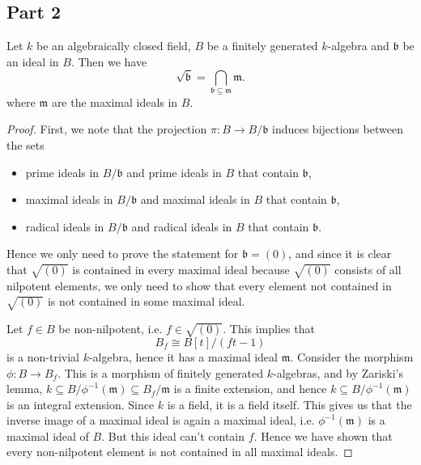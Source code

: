 \subsection{Part 2}
\begin{lemma}
Let $k$ be an algebraically closed field, 
$B$ be a finitely generated $k$-algebra and $\mathfrak{b}$ be an ideal in $B$. 
Then we have
\begin{equation*}
    \sqrt{\mathfrak{b}} = \bigcap_{\mathfrak{b}\subseteq\mathfrak{m}}\mathfrak{m}.
\end{equation*}
where $\mathfrak{m}$ are the maximal ideals in $B$.
\end{lemma}
\begin{proof}
First, 
we note that the projection $\pi:B\rightarrow B/\mathfrak{b}$ induces bijections between the sets
\begin{itemize}
    \item prime ideals in $B/\mathfrak{b}$ and prime ideals in $B$ that contain $\mathfrak{b}$,
    \item maximal ideals in $B/\mathfrak{b}$ and maximal ideals in $B$ that contain $\mathfrak{b}$,
    \item radical ideals in $B/\mathfrak{b}$ and radical ideals in $B$ that contain $\mathfrak{b}$.
\end{itemize}
Hence we only need to prove the statement for $\mathfrak{b}=(0)$, 
and since it is clear that $\sqrt{(0)}$ is contained in every maximal ideal because $\sqrt{(0)}$ consists of all nilpotent elements, 
we only need to show that every element not contained in $\sqrt{(0)}$ is not contained in some maximal ideal. 

Let $f\in B$ be non-nilpotent, 
i.e. $f\in \sqrt{(0)}$. 
This implies that $$B_f\cong B[t]/(ft-1)$$ is a non-trivial $k$-algebra, 
hence it has a maximal ideal $\mathfrak{m}$. 
Consider the morphism $\phi: B \longrightarrow B_f$. 
This is a morphism of finitely generated $k$-algebras, 
and by Zariski's lemma, 
$k\subseteq B/\phi^{-1}(\mathfrak{m})\subseteq B_f/\mathfrak{m}$ is a finite extension, 
and hence $k\subseteq B/\phi^{-1}(\mathfrak{m})$ is an integral extension. 
Since $k$ is a field, it is a field itself. 
This gives us that the inverse image of a maximal ideal is again a maximal ideal, 
i.e. $\phi^{-1}(\mathfrak{m})$ is a maximal ideal of $B$. 
But this ideal can't contain $f$. 
Hence we have shown that every non-nilpotent element is not contained in all maximal ideals. 
\end{proof}



